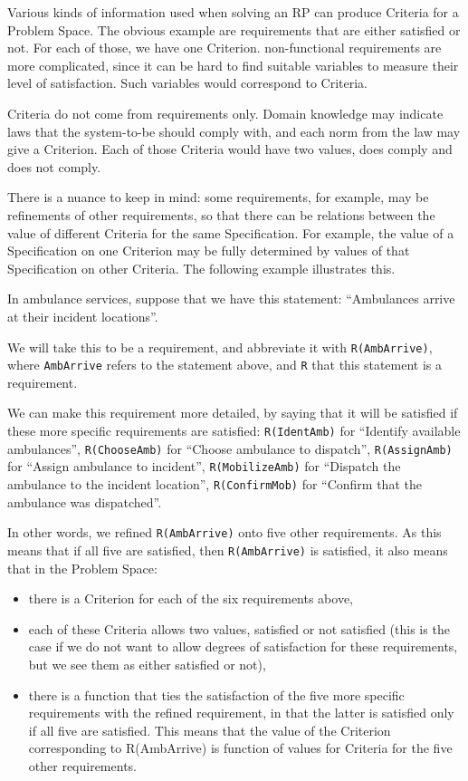\documentclass[graybox]{svmult}
\newcommand{\xt}[1]{\texttt{#1}}
\newcommand{\req}[1]{\xt{#1}}
\newcommand{\RP}{RP}
\newcommand{\ProblemSpace}{Problem Space}
\newcommand{\Specification}{Specification}
\newcommand{\Criterion}{Criterion}
\newcommand{\Criteria}{Criteria}
\begin{document}
Various kinds of information used when solving an \RP{} can produce \Criteria{} for a \ProblemSpace. The obvious example are requirements that are either satisfied or not. For each of those, we have one \Criterion. non-functional requirements are more complicated, since it can be hard to find suitable variables to measure their level of satisfaction. Such variables would correspond to \Criteria. 

\Criteria{} do not come from requirements only. Domain knowledge may indicate laws that the system-to-be should comply with, and each norm from the law may give a \Criterion. Each of those \Criteria{} would have two values, does comply and does not comply.

There is a nuance to keep in mind: some requirements, for example, may be refinements of other requirements, so that there can be relations between the value of different \Criteria{} for the same \Specification. For example, the value of a \Specification{} on one \Criterion{} may be fully determined by values of that \Specification{} on other \Criteria. The following example illustrates this.

In ambulance services, suppose that we have this statement: ``Ambulances arrive at their incident locations''.

We will take this to be a requirement, and abbreviate it with \req{R(AmbArrive)}, where \req{AmbArrive} refers to the statement above, and \req{R} that this statement is a requirement.

We can make this requirement more detailed, by saying that it will be satisfied if these more specific requirements are satisfied: \req{R(IdentAmb)} for ``Identify available ambulances'', \req{R(ChooseAmb)} for ``Choose ambulance to dispatch'', \req{R(AssignAmb)} for ``Assign ambulance to incident'', \req{R(MobilizeAmb)} for ``Dispatch the ambulance to the incident location'', \req{R(ConfirmMob)} for ``Confirm that the ambulance was dispatched''.

In other words, we refined \req{R(AmbArrive)} onto five other requirements. As this means that if all five are satisfied, then \req{R(AmbArrive)} is satisfied, it also means that in the \ProblemSpace: 
\begin{itemize}
    \item{there is a Criterion for each of the six requirements above,}
    \item{each of these Criteria allows two values, satisfied or not satisfied (this is the case if we do not want to allow degrees of satisfaction for these requirements, but we see them as either satisfied or not),}
    \item{there is a function that ties the satisfaction of the five more specific requirements with the refined requirement, in that the latter is satisfied only if all five are satisfied. This means that the value of the Criterion corresponding to R(AmbArrive) is function of values for Criteria for the five other requirements.}
\end{itemize}
\end{document}
